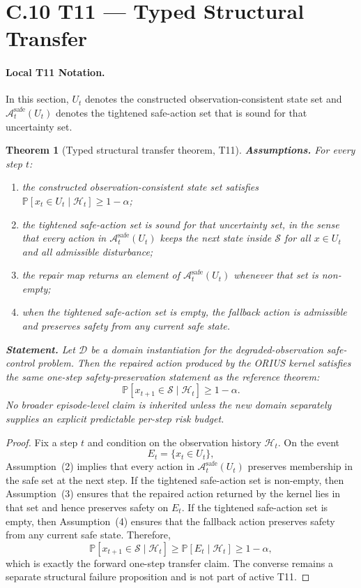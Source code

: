 \documentclass[11pt]{article}
\newtheorem{theorem}{Theorem}
\newcommand{\1}{\mathbf{1}}
\newcommand{\Prob}{\mathbb{P}}
\begin{document}
\section*{C.10 T11 --- Typed Structural Transfer}

\paragraph{Local T11 Notation.}
In this section, $U_t$ denotes the constructed observation-consistent state set
and $\mathcal{A}_t^{\mathrm{safe}}(U_t)$ denotes the tightened safe-action set
that is sound for that uncertainty set.

\begin{theorem}[Typed structural transfer theorem, T11]\label{thm:t11}
\textbf{Assumptions.} For every step $t$:
\begin{enumerate}
  \item the constructed observation-consistent state set satisfies
    $\Prob[x_t \in U_t \mid \mathcal{H}_t] \ge 1-\alpha$;
  \item the tightened safe-action set is sound for that uncertainty set, in
    the sense that every action in $\mathcal{A}_t^{\mathrm{safe}}(U_t)$ keeps
    the next state inside $\mathcal{S}$ for all $x \in U_t$ and all
    admissible disturbance;
  \item the repair map returns an element of
    $\mathcal{A}_t^{\mathrm{safe}}(U_t)$ whenever that set is non-empty;
  \item when the tightened safe-action set is empty, the fallback action is
    admissible and preserves safety from any current safe state.
\end{enumerate}
\textbf{Statement.} Let $\mathcal{D}$ be a domain instantiation for the
degraded-observation safe-control problem. Then the repaired action produced by
the ORIUS kernel satisfies the same one-step safety-preservation statement as
the reference theorem:
\[
  \Prob[x_{t+1}\in\mathcal{S}\mid \mathcal{H}_t] \ge 1-\alpha.
\]
No broader episode-level claim is inherited unless the new domain separately
supplies an explicit predictable per-step risk budget.
\end{theorem}

\begin{proof}
Fix a step $t$ and condition on the observation history $\mathcal{H}_t$. On the
event
\[
  E_t = \{x_t \in U_t\},
\]
Assumption~(2) implies that every action in
$\mathcal{A}_t^{\mathrm{safe}}(U_t)$ preserves membership in the safe set at
the next step. If the tightened safe-action set is non-empty, then
Assumption~(3) ensures that the repaired action returned by the kernel lies in
that set and hence preserves safety on $E_t$. If the tightened safe-action set
is empty, then Assumption~(4) ensures that the fallback action preserves safety
from any current safe state. Therefore,
\[
  \Prob[x_{t+1}\in\mathcal{S} \mid \mathcal{H}_t]
  \ge
  \Prob[E_t \mid \mathcal{H}_t]
  \ge
  1-\alpha,
\]
which is exactly the forward one-step transfer claim. The converse remains a
separate structural failure proposition and is not part of active T11.
\qedhere
\end{proof}
\end{document}

